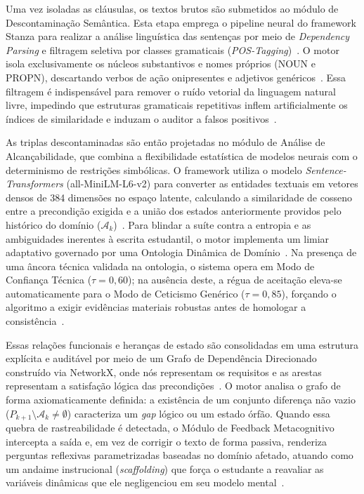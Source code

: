 \documentclass[ruledheader]{abnt_UFF}[abntex2]
\begin{document}
Uma vez isoladas as cláusulas, os textos brutos são submetidos ao módulo de Descontaminação Semântica. Esta etapa emprega o pipeline neural do framework Stanza para realizar a análise linguística das sentenças por meio de \textit{Dependency Parsing} e filtragem seletiva por classes gramaticais (\textit{POS-Tagging})~\cite{qi2020stanza}. O motor isola exclusivamente os núcleos substantivos e nomes próprios (NOUN e PROPN), descartando verbos de ação onipresentes e adjetivos genéricos~\cite{tahvili2025comparative}. Essa filtragem é indispensável para remover o ruído vetorial da linguagem natural livre, impedindo que estruturas gramaticais repetitivas inflem artificialmente os índices de similaridade e induzam o auditor a falsos positivos~\cite{tahvili2025comparative}.

As triplas descontaminadas são então projetadas no módulo de Análise de Alcançabilidade, que combina a flexibilidade estatística de modelos neurais com o determinismo de restrições simbólicas. O framework utiliza o modelo \textit{Sentence-Transformers} (all-MiniLM-L6-v2) para converter as entidades textuais em vetores densos de 384 dimensões no espaço latente, calculando a similaridade de cosseno entre a precondição exigida e a união dos estados anteriormente providos pelo histórico do domínio ($\mathcal{A}_k$)~\cite{reimers2019sentence}. Para blindar a suíte contra a entropia e as ambiguidades inerentes à escrita estudantil, o motor implementa um limiar adaptativo governado por uma Ontologia Dinâmica de Domínio~\cite{tahvili2025comparative}. Na presença de uma âncora técnica validada na ontologia, o sistema opera em Modo de Confiança Técnica ($\tau = 0,60$); na ausência deste, a régua de aceitação eleva-se automaticamente para o Modo de Ceticismo Genérico ($\tau = 0,85$), forçando o algoritmo a exigir evidências materiais robustas antes de homologar a consistência~\cite{zhao2024large}.

Essas relações funcionais e heranças de estado são consolidadas em uma estrutura explícita e auditável por meio de um Grafo de Dependência Direcionado construído via NetworkX, onde nós representam os requisitos e as arestas representam a satisfação lógica das precondições~\cite{hagberg2008exploring}. O motor analisa o grafo de forma axiomaticamente definida: a existência de um conjunto diferença não vazio ($P_{k+1} \setminus \mathcal{A}_k \neq \emptyset$) caracteriza um \textit{gap} lógico ou um estado órfão. Quando essa quebra de rastreabilidade é detectada, o Módulo de Feedback Metacognitivo intercepta a saída e, em vez de corrigir o texto de forma passiva, renderiza perguntas reflexivas parametrizadas baseadas no domínio afetado, atuando como um andaime instrucional (\textit{scaffolding}) que força o estudante a reavaliar as variáveis dinâmicas que ele negligenciou em seu modelo mental~\cite{santiago2023proposta}.
\end{document}
